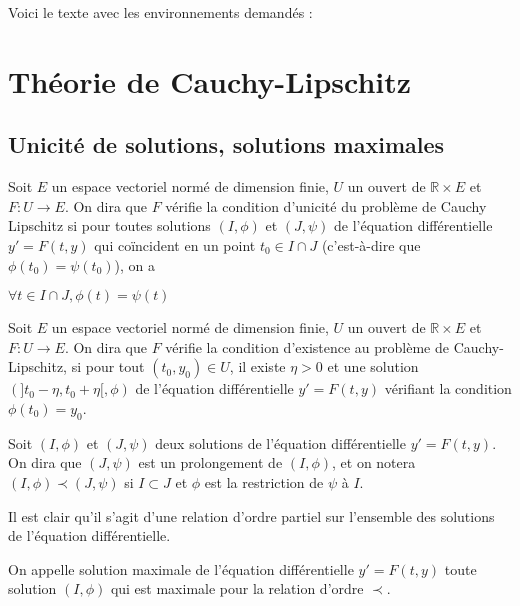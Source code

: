 Voici le texte avec les environnements demandés :

\section{Théorie de Cauchy-Lipschitz}

\subsection{Unicité de solutions, solutions maximales}

\begin{de}
Soit $E$ un espace vectoriel normé de dimension finie, $U$
un ouvert de $\mathbb{R} \times E$ et $F : U \rightarrow E$. On dira que $F$ vérifie la condition
d'unicité du problème de Cauchy Lipschitz si pour toutes solutions $(I,\phi)$
et $(J,\psi)$ de l'équation différentielle $y' = F(t,y)$ qui coïncident en un
point $t_0 \in I \cap J$ (c'est-à-dire que $\phi(t_0) =
\psi(t_0)$), on a

$\forall t \in I \cap J, \phi(t) = \psi(t)$
\end{de}

\begin{de}
Soit $E$ un espace vectoriel normé de dimension finie, $U$
un ouvert de $\mathbb{R} \times E$ et $F : U \rightarrow E$. On dira que $F$ vérifie la condition
d'existence au problème de Cauchy-Lipschitz, si pour tout
$(t_0,y_0) \in U$, il existe $\eta > 0$ et une
solution $(]t_0 - \eta,t_0 + \eta[,\phi)$ de l'équation
différentielle $y' = F(t,y)$ vérifiant la condition $\phi(t_0) =
y_0$.
\end{de}

\begin{de}
Soit $(I,\phi)$ et $(J,\psi)$ deux solutions de l'équation
différentielle $y' = F(t,y)$. On dira que $(J,\psi)$ est un prolongement de
$(I,\phi)$, et on notera $(I,\phi) \prec (J,\psi)$ si $I \subset J$ et $\phi$ est la restriction de $\psi$
à $I$.
\end{de}

\begin{rem}
Il est clair qu'il s'agit d'une relation d'ordre partiel
sur l'ensemble des solutions de l'équation différentielle.
\end{rem}

\begin{de} 
On appelle solution maximale de l'équation
différentielle $y' = F(t,y)$ toute solution $(I,\phi)$ qui est maximale pour la
relation d'ordre $\prec$.
\end{de}

